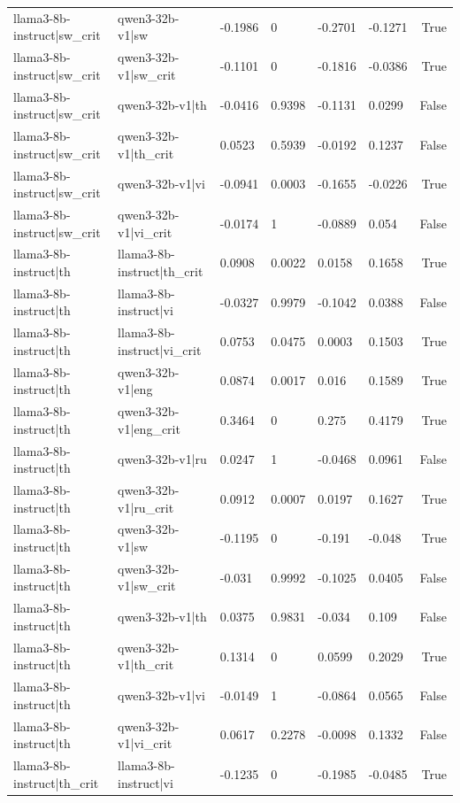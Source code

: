 \begin{table}
\begin{tabular}{llllllr}
llama3-8b-instruct|sw_crit & qwen3-32b-v1|sw & -0.1986 & 0 & -0.2701 & -0.1271 & True \\
llama3-8b-instruct|sw_crit & qwen3-32b-v1|sw_crit & -0.1101 & 0 & -0.1816 & -0.0386 & True \\
llama3-8b-instruct|sw_crit & qwen3-32b-v1|th & -0.0416 & 0.9398 & -0.1131 & 0.0299 & False \\
llama3-8b-instruct|sw_crit & qwen3-32b-v1|th_crit & 0.0523 & 0.5939 & -0.0192 & 0.1237 & False \\
llama3-8b-instruct|sw_crit & qwen3-32b-v1|vi & -0.0941 & 0.0003 & -0.1655 & -0.0226 & True \\
llama3-8b-instruct|sw_crit & qwen3-32b-v1|vi_crit & -0.0174 & 1 & -0.0889 & 0.054 & False \\
llama3-8b-instruct|th & llama3-8b-instruct|th_crit & 0.0908 & 0.0022 & 0.0158 & 0.1658 & True \\
llama3-8b-instruct|th & llama3-8b-instruct|vi & -0.0327 & 0.9979 & -0.1042 & 0.0388 & False \\
llama3-8b-instruct|th & llama3-8b-instruct|vi_crit & 0.0753 & 0.0475 & 0.0003 & 0.1503 & True \\
llama3-8b-instruct|th & qwen3-32b-v1|eng & 0.0874 & 0.0017 & 0.016 & 0.1589 & True \\
llama3-8b-instruct|th & qwen3-32b-v1|eng_crit & 0.3464 & 0 & 0.275 & 0.4179 & True \\
llama3-8b-instruct|th & qwen3-32b-v1|ru & 0.0247 & 1 & -0.0468 & 0.0961 & False \\
llama3-8b-instruct|th & qwen3-32b-v1|ru_crit & 0.0912 & 0.0007 & 0.0197 & 0.1627 & True \\
llama3-8b-instruct|th & qwen3-32b-v1|sw & -0.1195 & 0 & -0.191 & -0.048 & True \\
llama3-8b-instruct|th & qwen3-32b-v1|sw_crit & -0.031 & 0.9992 & -0.1025 & 0.0405 & False \\
llama3-8b-instruct|th & qwen3-32b-v1|th & 0.0375 & 0.9831 & -0.034 & 0.109 & False \\
llama3-8b-instruct|th & qwen3-32b-v1|th_crit & 0.1314 & 0 & 0.0599 & 0.2029 & True \\
llama3-8b-instruct|th & qwen3-32b-v1|vi & -0.0149 & 1 & -0.0864 & 0.0565 & False \\
llama3-8b-instruct|th & qwen3-32b-v1|vi_crit & 0.0617 & 0.2278 & -0.0098 & 0.1332 & False \\
llama3-8b-instruct|th_crit & llama3-8b-instruct|vi & -0.1235 & 0 & -0.1985 & -0.0485 & True \\

\end{tabular}
\end{table}
